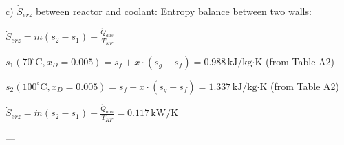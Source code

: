 c) \( \dot{S}_{erz} \) between reactor and coolant:  
Entropy balance between two walls:  

\( \dot{S}_{erz} = \dot{m} (s_2 - s_1) - \frac{\dot{Q}_{aus}}{T_{KF}} \)  

\( s_1 (70^\circ \text{C}, x_D = 0.005) = s_f + x \cdot (s_g - s_f) = 0.988 \, \text{kJ/kg·K} \) (from Table A2)  

\( s_2 (100^\circ \text{C}, x_D = 0.005) = s_f + x \cdot (s_g - s_f) = 1.337 \, \text{kJ/kg·K} \) (from Table A2)  

\( \dot{S}_{erz} = \dot{m} (s_2 - s_1) - \frac{\dot{Q}_{aus}}{T_{KF}} = 0.117 \, \text{kW/K} \)  

---